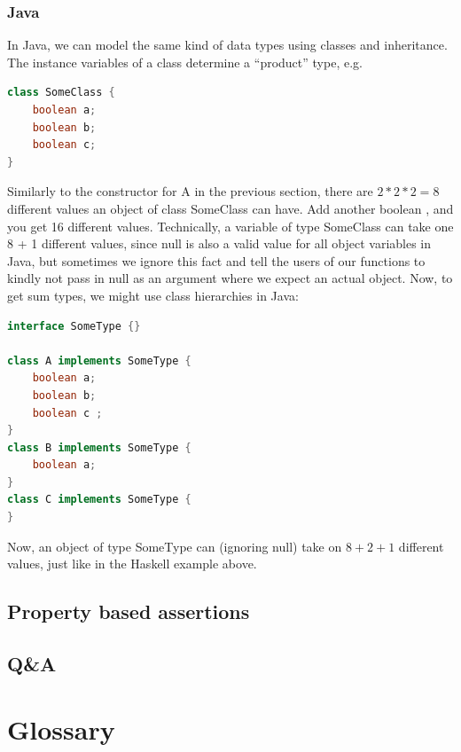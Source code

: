 \documentclass{article}
\begin{document}
            \subsubsection*{Java}
            In Java, we can model the same kind of data types using classes and inheritance. The instance
            variables of a class determine a “product” type, e.g.
            \begin{lstlisting}[language=Java]
class SomeClass {
    boolean a;
    boolean b;
    boolean c;
}
            \end{lstlisting}
        Similarly to the constructor for A in the previous section, there are $2 * 2 * 2 = 8$ different
values an object of class SomeClass can have. Add another boolean , and you get 16 different
values. Technically, a variable of type SomeClass can take one 8 + 1 different values, since
null is also a valid value for all object variables in Java, but sometimes we ignore this fact
and tell the users of our functions to kindly not pass in null as an argument where we expect
an actual object.
Now, to get sum types, we might use class hierarchies in Java:

\begin{lstlisting}[language=Java]
interface SomeType {}

class A implements SomeType {
    boolean a;
    boolean b;
    boolean c ;
}
class B implements SomeType {
    boolean a;
}
class C implements SomeType {
}

\end{lstlisting}
    Now, an object of type SomeType can (ignoring null) take on $8 + 2 + 1$ different values,
    just like in the Haskell example above.

        \subsection{Property based assertions}
        \subsection{Q\&A}

    \appendix
    \section{Glossary}
    \printnoidxglossaries
\end{document}
